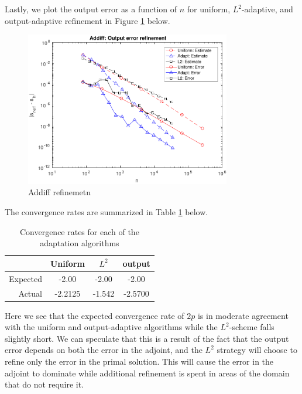 \documentclass{article}
\begin{document}
\begin{itemize}
	
	Lastly, we plot the output error as a function of \(n\) for uniform, \(L^2\)-adaptive, and output-adaptive refinement in Figure \ref{Addiff:refinement} below. 
	\begin{figure}[H]
		\centering
		\includegraphics[width=0.8\textwidth]{addiff_adapt.pdf}
		\caption{Addiff refinemetn}
		\label{Addiff:refinement}
	\end{figure}
	The convergence rates are summarized in Table  \ref{tab:3} below.
	\begin{table}[H]
		\centering
		\begin{tabular}{r||c|c|c}
			& Uniform & \(L^2 \) & output  \\
			\hline
			Expected & -2.00 & -2.00 & -2.00\\
			\hline
			Actual &-2.2125  & -1.542 & -2.5700\\
		\end{tabular}
		\caption{Convergence rates for each of the adaptation algorithms}
		\label{tab:3}
	\end{table}
\end{itemize}
Here we see that the expected convergence rate of \(2p\) is in moderate agreement with the uniform and output-adaptive algorithms while the \(L^2\)-scheme falls slightly short. We can speculate that this is a result of the fact that the output error depends on both the error in the adjoint, and the \(L^2\) strategy will choose to refine only the error in the primal solution. This will cause the error in the adjoint to dominate while additional refinement is spent in areas of the domain that do not require it. 

\clearpage
\end{document}
